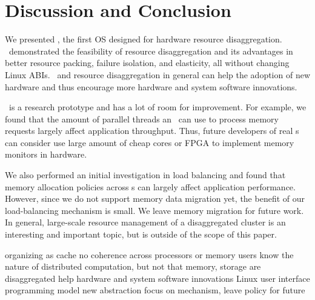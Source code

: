 \section{Discussion and Conclusion}
\label{sec:conclude}

We presented \lego, the first OS designed for hardware resource disaggregation.
\lego\ demonstrated the feasibility of resource disaggregation and its advantages in 
better resource packing, failure isolation, and elasticity, all without changing Linux ABIs.
\lego\ and resource disaggregation in general can help the adoption of new hardware
and thus encourage more hardware and system software innovations.  

\lego\ is a research prototype and has a lot of room for improvement.
For example, we found that the amount of parallel threads an \mcomponent\ can 
use to process memory requests largely affect application throughput. 
Thus, future developers of real \mcomponent{}s can consider use 
large amount of cheap cores or FPGA to implement memory monitors in hardware.

We also performed an initial investigation in load balancing 
and found that memory allocation policies across \mcomponent{}s can largely affect application performance.
However, since we do not support memory data migration yet, 
the benefit of our load-balancing mechanism is small.
We leave memory migration for future work.
In general, large-scale resource management of a disaggregated cluster is 
an interesting and important topic, but is outside of the scope of this paper.

organizing as cache
no coherence across processors or memory
users know the nature of distributed computation, but not that memory, storage are disaggregated
help hardware and system software innovations
Linux
user interface programming model
new abstraction
focus on mechanism, leave policy for future
\fi

